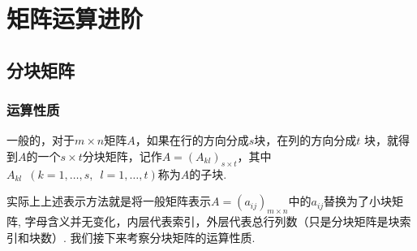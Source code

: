 \chapter{矩阵运算进阶}

\section{分块矩阵}
\subsection{运算性质}
\begin{definition}
    一般的，对于$m \times n$矩阵$A$，如果在行的方向分成$s$块，在列的方向分成$t$
    块，就得到$A$的一个$s \times t$分块矩阵，记作$A=(A_{kl})_{s \times t}$，其中
    $A_{kl}\enspace(k=1,\ldots,s,\enspace l=1,\ldots,t)$称为$A$的子块.
\end{definition}
实际上上述表示方法就是将一般矩阵表示$A=(a_{ij})_{m \times n}$中的$a_{ij}$替换为了小块矩阵,
字母含义并无变化，内层代表索引，外层代表总行列数（只是分块矩阵是块索引和块数）.
我们接下来考察分块矩阵的运算性质.
